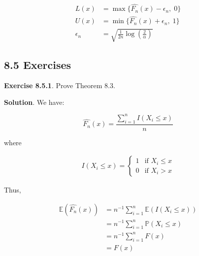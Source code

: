 \begin{align*}
L(x) &= \max \{ \hat{F_{n}}(x) - \epsilon_{n}, \; 0 \} \\
U(x) &= \min \{ \hat{F_{n}}(x) + \epsilon_{n}, \; 1 \} \\
\epsilon_{n} &= \sqrt{\frac{1}{2n} \log \left( \frac{2}{\alpha} \right) }
\end{align*}

\subsection*{8.5 Exercises}

\textbf{Exercise 8.5.1}. Prove Theorem 8.3.

\textbf{Solution}. We have:

\[
\hat{F_{n}}(x) = \frac{\sum_{i=1}^{n} I\left(X_{i} \leq x \right)}{n}
\]

where

\begin{align*}I\left(X_{i} \leq x\right) =
    \begin{cases}
      1   & \text{if } X_{i} \leq x \\
      0   & \text{if } X_{i} > x
    \end{cases}       
\end{align*}

Thus,

\begin{align*}
\mathbb{E}(\hat{F_{n}}(x)) & = n^{-1} \sum_{i = 1}^{n} \mathbb{E}(I\left(X_{i} \leq x \right)) \\
 & = n^{-1} \sum_{i = 1}^{n} \mathbb{P}\left(X_{i} \leq x \right) \\
 & = n^{-1} \sum_{i = 1}^{n} F(x) \\
 & = F(x)
\end{align*}

